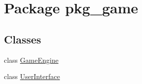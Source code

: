 \hypertarget{namespacepkg__game}{\section{Package pkg\-\_\-game}
\label{namespacepkg__game}
}
\subsection*{Classes}
\begin{DoxyCompactItemize}
\item 
class \hyperlink{classpkg__game_1_1GameEngine}{Game\-Engine}
\item 
class \hyperlink{classpkg__game_1_1UserInterface}{User\-Interface}
\end{DoxyCompactItemize}
